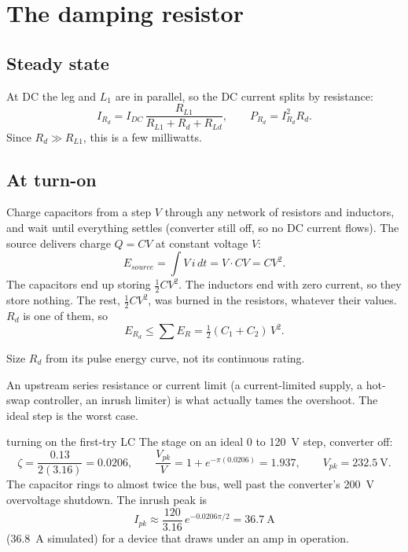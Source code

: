 \section{The damping resistor}

\subsection{Steady state}

At DC the leg and $L_1$ are in parallel, so the DC current splits by resistance:
\[
	I_{R_d} = I_{DC}\,\frac{R_{L1}}{R_{L1} + R_d + R_{Ld}}, \qquad P_{R_d} = I_{R_d}^2 R_d.
\]
Since $R_d \gg R_{L1}$, this is a few milliwatts.

\subsection{At turn-on}

\begin{derivation}
	Charge capacitors from a step $V$ through any network of resistors and
	inductors, and wait until everything settles (converter still off, so no
	DC current flows). The source delivers charge $Q = CV$ at constant voltage $V$:
	\[
		E_{source} = \int V\,i\,dt = V\cdot CV = CV^2.
	\]
	The capacitors end up storing $\tfrac{1}{2}CV^2$. The inductors end with
	zero current, so they store nothing. The rest, $\tfrac{1}{2}CV^2$, was burned
	in the resistors, whatever their values. $R_d$ is one of them, so
	\[
		E_{R_d} \leq \sum E_R = \tfrac{1}{2}(C_1 + C_2)\,V^2.
	\]
\end{derivation}

Size $R_d$ from its pulse energy curve, not its continuous rating.

\begin{idea}
	An upstream series resistance or current limit (a current-limited supply, a hot-swap controller, an inrush limiter)
	is what actually tames the overshoot. The ideal step is the worst case.
\end{idea}

\begin{examplebox}[label=ex:turn-on-lc]{turning on the first-try LC}
	The  stage on an ideal 0 to \qty{120}{\volt} step, converter off:
	\[
		\zeta = \frac{0.13}{2(3.16)} = 0.0206, \qquad
		\frac{V_{pk}}{V} = 1 + e^{-\pi(0.0206)} = 1.937, \qquad
		V_{pk} = \qty{232.5}{\volt}.
	\]
	The capacitor rings to almost twice the bus, well past the converter's
	\qty{200}{\volt} overvoltage shutdown. The inrush peak is
	\[
		I_{pk} \approx \frac{120}{3.16}\,e^{-0.0206\pi/2} = \qty{36.7}{\ampere}
	\]
	(\qty{36.8}{\ampere} simulated) for a device that draws under an amp in operation.
\end{examplebox}

